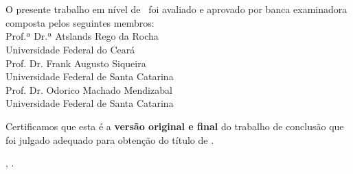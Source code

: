 \imprimircapa

\imprimirfolhaderosto*

\begin{fichacatalografica}
	
\end{fichacatalografica}

\begin{folhadeaprovacao}
	\OnehalfSpacing
	\centering
	\imprimirautor\\%
	\vspace*{10pt}		
	\textbf{\imprimirtitulo}%
	\ifnotempty{\imprimirsubtitulo}{:~\imprimirsubtitulo}\\%
	\vspace*{\baselineskip}
	O presente trabalho em nível de \imprimirnivel~foi avaliado e aprovado por banca examinadora composta pelos seguintes membros:\\
	\vspace*{\baselineskip}
	Prof.ª Dr.ª Atslands Rego da Rocha \\
	Universidade Federal do Ceará \\
	\vspace*{\baselineskip}
	Prof. Dr. Frank Augusto Siqueira\\
	Universidade Federal de Santa Catarina \\
        \vspace*{\baselineskip}
	Prof. Dr. Odorico Machado Mendizabal \\
	Universidade Federal de Santa Catarina \\
	\vspace*{2\baselineskip}
	\begin{minipage}{\textwidth}
		Certificamos que esta é a \textbf{versão original e final} do trabalho de conclusão que foi julgado adequado para obtenção do título de \imprimirformacao.\\
	\end{minipage}
	\vspace*{\fill}
	\vspace*{\fill}
	\assinatura{\OnehalfSpacing\imprimirorientador \\ \imprimirorientadorRotulo}
	\vspace*{\fill}
	\imprimirlocal, \imprimirano.
\end{folhadeaprovacao}

